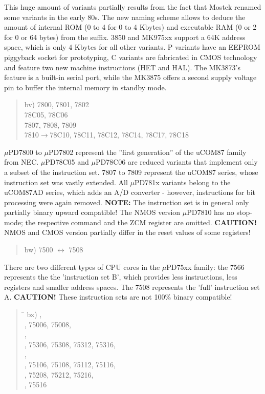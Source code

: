 \documentclass[12pt,twoside]{report}
\newcommand{\bb}[1]{{\bf #1}}
\begin{document}
This huge amount of variants partially results from the fact that
Mostek renamed some variants in the early 80s.  The new naming scheme
allows to deduce the amount of internal ROM (0 to 4 for 0 to 4 Kbytes) 
and executable RAM (0 or 2 for 0 or 64 bytes) from the suffix.  3850
and MK975xx support a 64K address space, which is only 4 Kbytes for all
other variants.  P variants have an EEPROM piggyback socket for prototyping,
C variants are fabricated in CMOS technology and feature two new machine
instructions (HET and HAL). The MK3873's feature is a built-in serial port,
while the MK3875 offers a second supply voltage pin to buffer the internal
memory in standby mode.
\begin{quote}
bv) 7800, 7801, 7802 \\
78C05, 78C06 \\
7807, 7808, 7809 \\
7810$\rightarrow$78C10, 78C11, 78C12, 78C14, 78C17, 78C18
\end{quote}
$\mu$PD7800 to $\mu$PD7802 represent the ''first generation'' of the
uCOM87 family from NEC.  $\mu$PD78C05 and $\mu$PD78C06 are reduced
variants that implement only a subset of the instruction set. 7807 to
7809 represent the uCOM87 series, whose instruction set was vastly
extended.  All $\mu$PD781x variants belong to the uCOM87AD series, which
adds an A/D converter - however, instructions for bit processing were
again removed.  \bb{NOTE:} The instruction set is in general only
partially binary upward compatible! The NMOS version $\mu$PD7810 has
no stop-mode; the respective command and the ZCM register are omitted.
\bb{CAUTION!}  NMOS and CMOS version partially differ in the reset
values of some registers!
\begin{quote}
bw) 7500 $\leftrightarrow$ 7508
\end{quote}
There are two different types of CPU cores in the $\mu$PD75xx
family: the 7566 represents the the 'instruction set B', which
provides less instructions, less registers and smaller address
spaces.  The 7508 represents the 'full' instruction set A.  {\bf
CAUTION!} These instruction sets are not 100\% binary compatible!
\begin{quote}
\begin{tabbing}
\hspace{0.7cm} \= \kill
bx) ,\\
    , 75006, 75008,\\
    ,\\
    , 75306, 75308, 75312, 75316,\\
    ,\\
    , 75106, 75108, 75112, 75116,\\
    , 75208, 75212, 75216,\\
    , 75516\\
\end{tabbing}
\end{quote}
\end{document}
